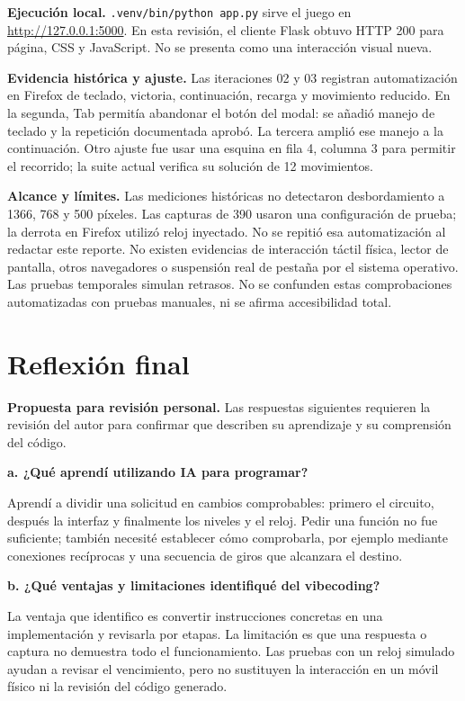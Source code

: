 \documentclass[12pt,letterpaper]{article}
\begin{document}
\textbf{Ejecución local.} \texttt{.venv/bin/python app.py} sirve el juego en \url{http://127.0.0.1:5000}. En esta revisión, el cliente Flask obtuvo HTTP 200 para página, CSS y JavaScript. No se presenta como una interacción visual nueva.

\textbf{Evidencia histórica y ajuste.} Las iteraciones 02 y 03 registran automatización en Firefox de teclado, victoria, continuación, recarga y movimiento reducido. En la segunda, Tab permitía abandonar el botón del modal: se añadió manejo de teclado y la repetición documentada aprobó. La tercera amplió ese manejo a la continuación. Otro ajuste fue usar una esquina en fila 4, columna 3 para permitir el recorrido; la suite actual verifica su solución de 12 movimientos.

\textbf{Alcance y límites.} Las mediciones históricas no detectaron desbordamiento a 1366, 768 y 500 píxeles. Las capturas de 390 usaron una configuración de prueba; la derrota en Firefox utilizó reloj inyectado. No se repitió esa automatización al redactar este reporte. No existen evidencias de interacción táctil física, lector de pantalla, otros navegadores o suspensión real de pestaña por el sistema operativo. Las pruebas temporales simulan retrasos. No se confunden estas comprobaciones automatizadas con pruebas manuales, ni se afirma accesibilidad total.

\clearpage
\section{Reflexión final}
\label{sec:reflexion}
\textbf{Propuesta para revisión personal.} Las respuestas siguientes requieren la revisión del autor para confirmar que describen su aprendizaje y su comprensión del código.

\textbf{a. ¿Qué aprendí utilizando IA para programar?}

Aprendí a dividir una solicitud en cambios comprobables: primero el circuito, después la interfaz y finalmente los niveles y el reloj. Pedir una función no fue suficiente; también necesité establecer cómo comprobarla, por ejemplo mediante conexiones recíprocas y una secuencia de giros que alcanzara el destino.

\textbf{b. ¿Qué ventajas y limitaciones identifiqué del vibecoding?}

La ventaja que identifico es convertir instrucciones concretas en una implementación y revisarla por etapas. La limitación es que una respuesta o captura no demuestra todo el funcionamiento. Las pruebas con un reloj simulado ayudan a revisar el vencimiento, pero no sustituyen la interacción en un móvil físico ni la revisión del código generado.
\end{document}
